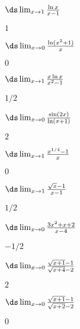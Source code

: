 \begin{enumialphparenastyle}
\begin{ex} 
 $\ds\lim_{x\to1}{\ln x\over x-1}$
\begin{sol}
 $1$
\end{sol}
\end{ex}

\begin{ex} 
 $\ds\lim_{x\to0}{\ln(x^2+1)\over x}$
\begin{sol}
 $0$
\end{sol}
\end{ex}

\begin{ex} 
 $\ds\lim_{x\to1}{x\ln x\over x^2-1}$
\begin{sol}
 $1/2$
\end{sol}
\end{ex}

\begin{ex} 
 $\ds\lim_{x\to0}{\sin(2x)\over\ln(x+1)}$
\begin{sol}
 $2$
\end{sol}
\end{ex}

\begin{ex} 
 $\ds\lim_{x\to1}{x^{1/4}-1\over x}$
\begin{sol}
 $0$
\end{sol}
\end{ex}

\begin{ex} 
 $\ds\lim_{x\to1}{\sqrt{x}-1\over x-1}$
\begin{sol}
 $1/2$
\end{sol}
\end{ex}

\begin{ex} 
 $\ds\lim_{x\to0}{3x^2+x+2\over x-4}$
\begin{sol}
 $-1/2$
\end{sol}
\end{ex}

\begin{ex} 
 $\ds\lim_{x\to0}{\sqrt{x+1}-1\over \sqrt{x+4}-2}$
\begin{sol}
 $2$
\end{sol}
\end{ex}

\begin{ex} 
 $\ds\lim_{x\to0}{\sqrt{x+1}-1\over \sqrt{x+2}-2}$
\begin{sol}
 $0$
\end{sol}
\end{ex}


\end{enumialphparenastyle}
